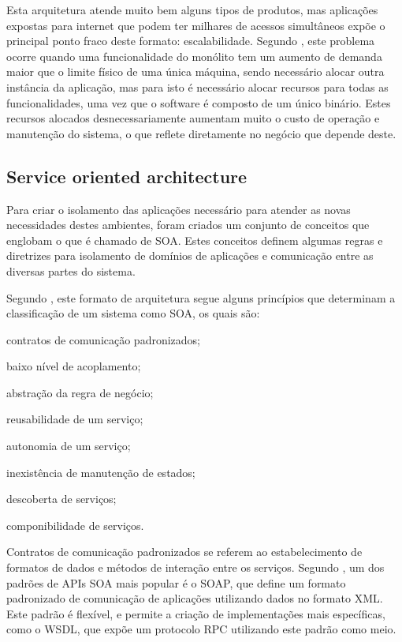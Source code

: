 Esta arquitetura atende muito bem alguns tipos de produtos, mas aplicações
expostas para internet que podem ter milhares de acessos simultâneos expõe o
principal ponto fraco deste formato: escalabilidade. Segundo
, este problema ocorre quando uma funcionalidade do
monólito tem um aumento de demanda maior que o limite físico de uma única
máquina, sendo necessário alocar outra instância da aplicação, mas para isto
é necessário alocar recursos para todas as funcionalidades, uma vez que o
software é composto de um único binário. Estes recursos alocados
desnecessariamente aumentam muito o custo de operação e manutenção do
sistema, o que reflete diretamente no negócio que depende deste.

\subsection{Service oriented architecture}

Para criar o isolamento das aplicações necessário para atender as novas
necessidades destes ambientes, foram criados um conjunto de conceitos
que englobam o que é chamado de \ac{SOA}. Estes conceitos definem algumas
regras e diretrizes para isolamento de domínios de aplicações e comunicação
entre as diversas partes do sistema.

Segundo , este formato de arquitetura segue alguns
princípios que determinam a classificação de um sistema como \ac{SOA},
os quais são:

\begin{alineas}
  \item contratos de comunicação padronizados;
  \item baixo nível de acoplamento;
  \item abstração da regra de negócio;
  \item reusabilidade de um serviço;
  \item autonomia de um serviço;
  \item inexistência de manutenção de estados;
  \item descoberta de serviços;
  \item componibilidade de serviços.
\end{alineas}

Contratos de comunicação padronizados se referem ao estabelecimento de
formatos de dados e métodos de interação entre os serviços. Segundo
, um dos padrões de APIs SOA mais popular é o
\ac{SOAP}, que define um formato padronizado de comunicação de
aplicações utilizando dados no formato \ac{XML}. Este padrão é flexível,
e permite a criação de implementações mais específicas, como o \ac{WSDL},
que expõe um protocolo \ac{RPC} utilizando este padrão como meio.


